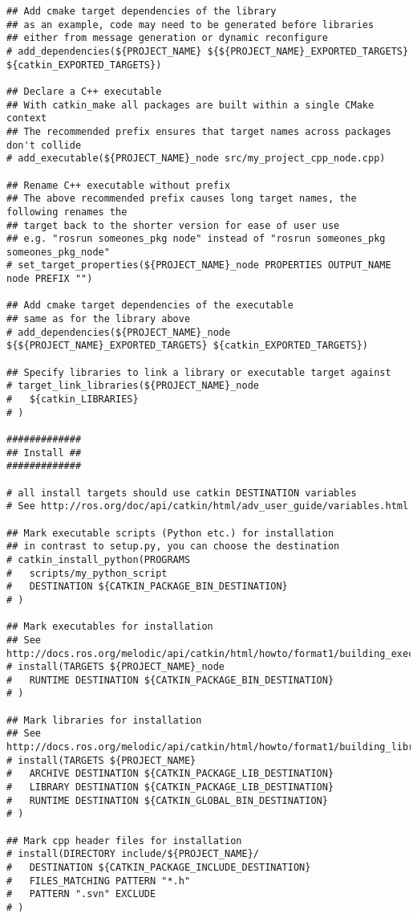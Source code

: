 \documentclass[letterpaper]{article}
\begin{document}
\begin{lstlisting}[style=xmlstyle, title=src/my\_project\_cpp/CMakeLists.txt]
## Add cmake target dependencies of the library
## as an example, code may need to be generated before libraries
## either from message generation or dynamic reconfigure
# add_dependencies(${PROJECT_NAME} ${${PROJECT_NAME}_EXPORTED_TARGETS} ${catkin_EXPORTED_TARGETS})

## Declare a C++ executable
## With catkin_make all packages are built within a single CMake context
## The recommended prefix ensures that target names across packages don't collide
# add_executable(${PROJECT_NAME}_node src/my_project_cpp_node.cpp)

## Rename C++ executable without prefix
## The above recommended prefix causes long target names, the following renames the
## target back to the shorter version for ease of user use
## e.g. "rosrun someones_pkg node" instead of "rosrun someones_pkg someones_pkg_node"
# set_target_properties(${PROJECT_NAME}_node PROPERTIES OUTPUT_NAME node PREFIX "")

## Add cmake target dependencies of the executable
## same as for the library above
# add_dependencies(${PROJECT_NAME}_node ${${PROJECT_NAME}_EXPORTED_TARGETS} ${catkin_EXPORTED_TARGETS})

## Specify libraries to link a library or executable target against
# target_link_libraries(${PROJECT_NAME}_node
#   ${catkin_LIBRARIES}
# )

#############
## Install ##
#############

# all install targets should use catkin DESTINATION variables
# See http://ros.org/doc/api/catkin/html/adv_user_guide/variables.html

## Mark executable scripts (Python etc.) for installation
## in contrast to setup.py, you can choose the destination
# catkin_install_python(PROGRAMS
#   scripts/my_python_script
#   DESTINATION ${CATKIN_PACKAGE_BIN_DESTINATION}
# )

## Mark executables for installation
## See http://docs.ros.org/melodic/api/catkin/html/howto/format1/building_executables.html
# install(TARGETS ${PROJECT_NAME}_node
#   RUNTIME DESTINATION ${CATKIN_PACKAGE_BIN_DESTINATION}
# )

## Mark libraries for installation
## See http://docs.ros.org/melodic/api/catkin/html/howto/format1/building_libraries.html
# install(TARGETS ${PROJECT_NAME}
#   ARCHIVE DESTINATION ${CATKIN_PACKAGE_LIB_DESTINATION}
#   LIBRARY DESTINATION ${CATKIN_PACKAGE_LIB_DESTINATION}
#   RUNTIME DESTINATION ${CATKIN_GLOBAL_BIN_DESTINATION}
# )

## Mark cpp header files for installation
# install(DIRECTORY include/${PROJECT_NAME}/
#   DESTINATION ${CATKIN_PACKAGE_INCLUDE_DESTINATION}
#   FILES_MATCHING PATTERN "*.h"
#   PATTERN ".svn" EXCLUDE
# )


\end{lstlisting}
\end{document}
